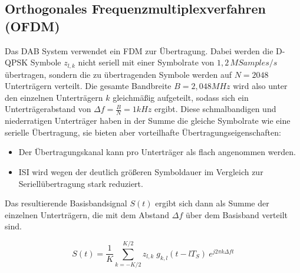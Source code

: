 \subsection{Orthogonales Frequenzmultiplexverfahren (OFDM)}
\label{sec:ofdm}
Das DAB System verwendet ein \ac{FDM} zur Übertragung. Dabei werden die D-QPSK Symbole $z_{l,k}$ nicht seriell mit einer Symbolrate von $1,2\, M Samples / s$ übertragen, sondern die zu übertragenden Symbole werden auf $N=2048$ Unterträgern verteilt. Die gesamte Bandbreite $B = 2,048 MHz$ wird also unter den einzelnen Unterträgern $k$ gleichmäßig aufgeteilt, sodass sich ein Unterträgerabstand von $\Delta f = \frac{B}{N} = 1kHz$ ergibt. Diese schmalbandigen und niederratigen Unterträger haben in der Summe die gleiche Symbolrate wie eine serielle Übertragung, sie bieten aber vorteilhafte Übertragungseigenschaften:
\begin{itemize}
\item Der Übertragungskanal kann pro Unterträger als flach angenommen werden.
\item \ac{ISI} wird wegen der deutlich größeren Symboldauer im Vergleich zur Seriellübertragung stark reduziert.
\end{itemize}
Das resultierende Basisbandsignal $S(t)$ ergibt sich dann als Summe der einzelnen Unterträgern, die mit dem Abstand $\Delta f$ über dem Basisband verteilt sind.

\begin{equation}
    S(t) = \frac{1}{K} \sum \limits_{k=-K/2}^{K/2} z_{l,k} \; g_{k,l}(t-lT_S) \: e^{j2\pi k \Delta f t}
\label{eq:ofdm_dft}
\end{equation}

